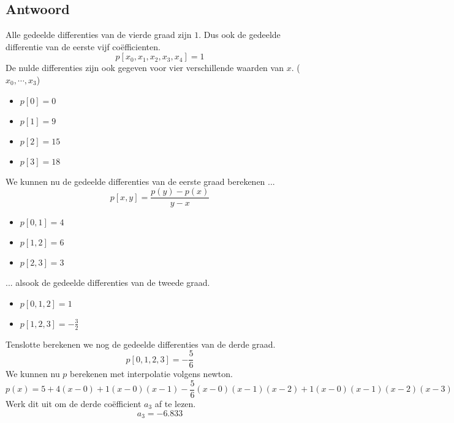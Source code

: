 \documentclass[examenvragen.tex]{subfiles}
\begin{document}
\subsection{Antwoord}
Alle gedeelde differenties van de vierde graad zijn $1$. Dus ook de gedeelde differentie van de eerste vijf co\"efficienten.
\[
p[x_{0},x_{1},x_{2},x_{3},x_{4}] = 1
\]
De nulde differenties zijn ook gegeven voor vier verschillende waarden van $x$. ($x_0,\cdots,x_3$)
\begin{multicols}{4}
\begin{itemize}
\item $p[0]=0$
\item $p[1]=9$
\item $p[2]=15$
\item $p[3]=18$
\end{itemize}
\end{multicols}
\noindent We kunnen nu de gedeelde differenties van de eerste graad berekenen ...
\[
p[x,y] = \frac{p(y) - p(x)}{y-x}
\]
\begin{multicols}{3}
\begin{itemize}
\item $p[0,1] = 4$
\item $p[1,2] = 6$
\item $p[2,3] = 3$
\end{itemize}
\end{multicols}
\noindent ... alsook de gedeelde differenties van de tweede graad.
\begin{multicols}{2}
\begin{itemize}
\item $p[0,1,2] = 1$
\item $p[1,2,3] = -\frac{3}{2}$
\end{itemize}
\end{multicols}
Tenslotte berekenen we nog de gedeelde differenties van de derde graad.
\[
p[0,1,2,3] = -\frac{5}{6}
\]
We kunnen nu $p$ berekenen met interpolatie volgens newton.
\[
p(x) = 5+4(x-0)+1(x-0)(x-1)-\frac{5}{6}(x-0)(x-1)(x-2) + 1(x-0)(x-1)(x-2)(x-3)
\]
Werk dit uit om de derde co\"efficient $a_3$ af te lezen.
\[
a_3 = -6.833
\]
\end{document}
